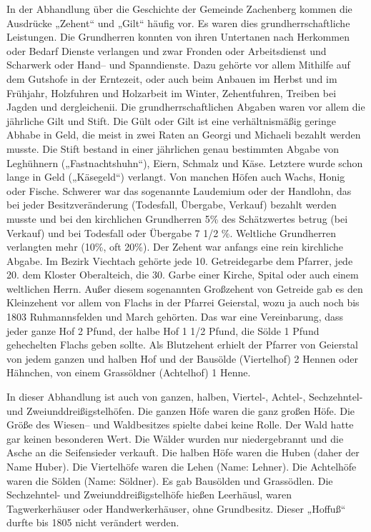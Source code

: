 \documentclass[12pt,a4pager]{book}
\begin{document}
In der Abhandlung über die Geschichte der Gemeinde Zachenberg kommen die
Ausdrücke „Zehent“ und „Gilt“ häufig vor. Es waren dies grundherrschaftliche
Leistungen. Die Grundherren konnten von ihren Untertanen nach Herkommen oder
Bedarf Dienste verlangen und zwar Fronden oder Arbeitsdienst und Scharwerk oder
Hand– und Spanndienste. Dazu gehörte vor allem Mithilfe auf dem Gutshofe in der
Erntezeit, oder auch beim Anbauen im Herbst und im Frühjahr, Holzfuhren und
Holzarbeit im Winter, Zehentfuhren, Treiben bei Jagden und dergleichenii. Die
grundherrschaftlichen Abgaben waren vor allem die jährliche Gilt und Stift. Die
Gült oder Gilt ist eine verhältnismäßig geringe Abhabe in Geld, die meist in
zwei Raten an Georgi und Michaeli bezahlt werden musste. Die Stift bestand in
einer jährlichen genau bestimmten Abgabe von Leghühnern („Fastnachtshuhn“),
Eiern, Schmalz und Käse. Letztere wurde schon lange in Geld („Käsegeld“)
verlangt. Von manchen Höfen auch Wachs, Honig oder Fische. Schwerer war das
sogenannte Laudemium oder der Handlohn, das bei jeder Besitzveränderung
(Todesfall, Übergabe, Verkauf) bezahlt werden musste und bei den kirchlichen
Grundherren 5\% des Schätzwertes betrug (bei Verkauf) und bei Todesfall oder
Übergabe 7 1/2 \%. Weltliche Grundherren verlangten mehr (10\%, oft 20\%). Der
Zehent war anfangs eine rein kirchliche Abgabe. Im Bezirk Viechtach gehörte jede
10. Getreidegarbe dem Pfarrer, jede 20. dem Kloster Oberalteich, die 30. Garbe
einer Kirche, Spital oder auch einem weltlichen Herrn. Außer diesem sogenannten
Großzehent von Getreide gab es den Kleinzehent vor allem von Flachs in der
Pfarrei Geierstal, wozu ja auch noch bis 1803 Ruhmannsfelden und March gehörten.
Das war eine Vereinbarung, dass jeder ganze Hof 2 Pfund, der halbe Hof 1 1/2
Pfund, die Sölde 1 Pfund gehechelten Flachs geben sollte. Als Blutzehent erhielt
der Pfarrer von Geierstal von jedem ganzen und halben Hof und der Bausölde
(Viertelhof) 2 Hennen oder Hähnchen, von einem Grassöldner (Achtelhof) 1 Henne.

In dieser Abhandlung ist auch von ganzen, halben, Viertel-, Achtel-,
Sechzehntel- und Zweiunddreißigstelhöfen. Die ganzen Höfe waren die ganz großen
Höfe. Die Größe des Wiesen– und Waldbesitzes spielte dabei keine Rolle. Der Wald
hatte gar keinen besonderen Wert. Die Wälder wurden nur niedergebrannt und die
Asche an die Seifensieder verkauft. Die halben Höfe waren die Huben (daher der
Name Huber). Die Viertelhöfe waren die Lehen (Name: Lehner). Die Achtelhöfe
waren die Sölden (Name: Söldner). Es gab Bausölden und Grassödlen. Die
Sechzehntel- und Zweiunddreißigstelhöfe hießen Leerhäusl, waren Tagwerkerhäuser
oder Handwerkerhäuser, ohne Grundbesitz. Dieser „Hoffuß“ durfte bis 1805 nicht
verändert werden.
\end{document}
